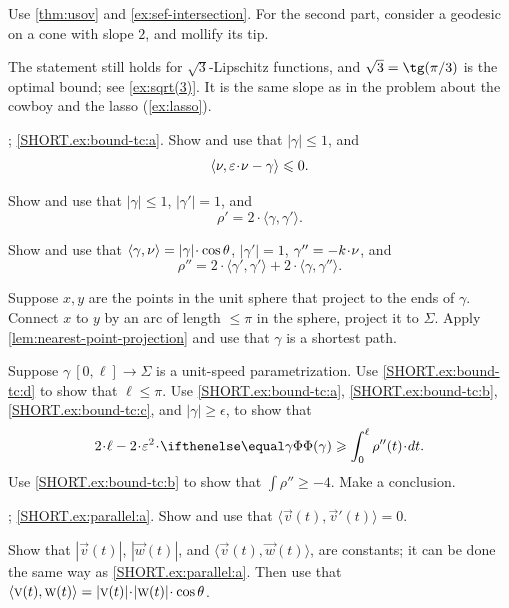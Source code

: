 Use \ref{thm:usov} and \ref{ex:sef-intersection}.
For the second part, consider a geodesic on a cone with slope $2$, and mollify its tip.

The statement still holds for $\sqrt{3}$-Lipschitz functions, and $\sqrt{3}=\tg\tfrac\pi3$ is the optimal bound; see \ref{ex:sqrt(3)}.
It is the same slope as in the problem about the cowboy and the lasso (\ref{ex:lasso}).

\parbf{\ref{ex:bound-tc}}; \ref{SHORT.ex:bound-tc:a}.
Show and use that $|\gamma|\le 1$, and
\[\langle\Norm,\epsilon\cdot \Norm-\gamma\rangle\le0.\]

Show and use that $|\gamma|\le1$, $|\gamma'|=1$, and
\[\rho'=2\cdot \langle\gamma,\gamma'\rangle.\]

Show and use that $\langle\gamma,\Norm\rangle=|\gamma|\cdot\cos\theta$, $|\gamma'|=1$, $\gamma''=-k\cdot \Norm$, and
\[\rho''=2\cdot \langle\gamma',\gamma'\rangle+2\cdot \langle\gamma,\gamma''\rangle.\]

Suppose $x,y$ are the points in the unit sphere that project to the ends of $\gamma$. 
Connect $x$ to $y$ by an arc of length $\le \pi$ in the sphere, project it to $\Sigma$.
Apply \ref{lem:nearest-point-projection} and use that $\gamma$ is a shortest path.

Suppose $\gamma\:[0,\ell]\to\Sigma$ is a unit-speed parametrization.
Use \ref{SHORT.ex:bound-tc:d} to show that $\ell\le \pi$.
Use \ref{SHORT.ex:bound-tc:a}, \ref{SHORT.ex:bound-tc:b}, \ref{SHORT.ex:bound-tc:c}, and $|\gamma|\ge \epsilon$, to show that 
\[2\cdot \ell-2\cdot \epsilon^2\cdot \tc{\gamma}
\ge
\int_0^\ell\rho''(t)\cdot dt.\]
Use \ref{SHORT.ex:bound-tc:b} to show that $\int\rho''\ge -4$.
Make a conclusion.

 
\setcounter{eqtn}{0}

\parbf{\ref{ex:parallel}}; \ref{SHORT.ex:parallel:a}.
Show and use that $\langle\vec v(t),\vec v'(t)\rangle=0$.

\parit{\ref{SHORT.ex:parallel:b}}
Show that $|\vec v(t)|$, $|\vec w(t)|$, and
$\langle\vec v(t),\vec w(t)\rangle$,
are constants; it can be done the same way as \ref{SHORT.ex:parallel:a}.
Then use that 
$\langle\vec v(t),\vec w(t)\rangle\z=|\vec v(t)|\cdot|\vec w(t)|\cdot\cos\theta$.


